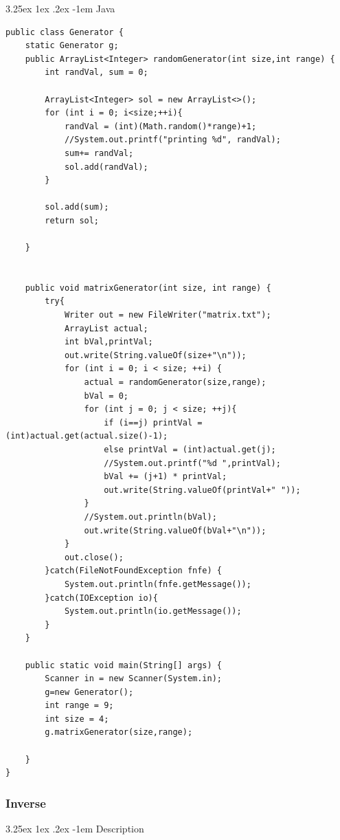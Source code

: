 \documentclass{article}
\makeatletter
\renewcommand\paragraph{\@startsection{paragraph}{5}{\z@}%
  {3.25ex \@plus1ex \@minus.2ex}%
  {-1em}%
  {\normalfont\normalsize\bfseries}}
\makeatother
\begin{document}
\paragraph{Java}
\hfill \break
\begin{lstlisting}
public class Generator {
    static Generator g;
    public ArrayList<Integer> randomGenerator(int size,int range) {
        int randVal, sum = 0;
        
        ArrayList<Integer> sol = new ArrayList<>();
        for (int i = 0; i<size;++i){
            randVal = (int)(Math.random()*range)+1;
            //System.out.printf("printing %d", randVal);
            sum+= randVal;
            sol.add(randVal);
        }

        sol.add(sum);
        return sol;
        
    }
    
    
    public void matrixGenerator(int size, int range) {
        try{
            Writer out = new FileWriter("matrix.txt");
            ArrayList actual;
            int bVal,printVal;
            out.write(String.valueOf(size+"\n"));
            for (int i = 0; i < size; ++i) {
                actual = randomGenerator(size,range);
                bVal = 0;
                for (int j = 0; j < size; ++j){
                    if (i==j) printVal = (int)actual.get(actual.size()-1);
                    else printVal = (int)actual.get(j);
                    //System.out.printf("%d ",printVal);
                    bVal += (j+1) * printVal;
                    out.write(String.valueOf(printVal+" "));
                }
                //System.out.println(bVal);
                out.write(String.valueOf(bVal+"\n"));
            }
            out.close();
        }catch(FileNotFoundException fnfe) { 
            System.out.println(fnfe.getMessage());
        }catch(IOException io){
            System.out.println(io.getMessage());
        }
    }

    public static void main(String[] args) {
        Scanner in = new Scanner(System.in);
        g=new Generator();
        int range = 9;
        int size = 4;
        g.matrixGenerator(size,range);

    }
}
\end{lstlisting}

\subsubsection{Inverse}

\paragraph{Description}
\hfill \break
\end{document}
